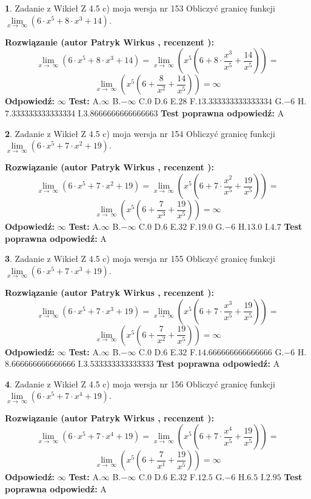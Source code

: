 \documentclass[12pt, a4paper]{article}
\theoremstyle{definition} %
\newtheorem{zad}{}
\newcommand{\zadStart}[1]{\begin{zad}#1\newline}
\newcommand{\zadStop}{\end{zad}}
\newcommand{\rozwStart}[2]{\noindent \textbf{Rozwiązanie (autor #1 , recenzent #2): }\newline}
\newcommand{\rozwStop}{\newline}
\newcommand{\odpStart}{\noindent \textbf{Odpowiedź:}\newline}
\newcommand{\odpStop}{\newline}
\newcommand{\testStart}{\noindent \textbf{Test:}\newline}
\newcommand{\testStop}{\newline}
\newcommand{\kluczStart}{\noindent \textbf{Test poprawna odpowiedź:}\newline}
\newcommand{\kluczStop}{\newline}
\begin{document}
\zadStart{Zadanie z Wikieł Z 4.5 c) moja wersja nr 153}
Obliczyć granicę funkcji  $\lim\limits_{x\to\ \infty}(6 \cdot x^{5}+8 \cdot x^{3}+14)$.
\zadStop
\rozwStart{Patryk Wirkus}{}
$$\lim\limits_{x\to\ \infty}(6 \cdot x^{5}+8 \cdot x^{3}+14) = \lim\limits_{x\to\ \infty}(x^{5}(6 +8 \cdot \frac{x^{3}}{x^{5}}+\frac{14}{x^{5}})) =$$ $$\lim\limits_{x\to\ \infty}(x^{5}(6 +\frac{8}{x^{2}}+\frac{14}{x^{5}})) =\infty$$
\rozwStop
\odpStart
$\infty$
\odpStop
\testStart
A.$\infty$ B.$-\infty$ C.$0$ D.$6$ E.$28$
F.$13.333333333333334$ G.$-6$
H.$7.333333333333334$
I.$3.8666666666666663$
\testStop
\kluczStart
A
\kluczStop



\zadStart{Zadanie z Wikieł Z 4.5 c) moja wersja nr 154}
Obliczyć granicę funkcji  $\lim\limits_{x\to\ \infty}(6 \cdot x^{5}+7 \cdot x^{2}+19)$.
\zadStop
\rozwStart{Patryk Wirkus}{}
$$\lim\limits_{x\to\ \infty}(6 \cdot x^{5}+7 \cdot x^{2}+19) = \lim\limits_{x\to\ \infty}(x^{5}(6 +7 \cdot \frac{x^{2}}{x^{5}}+\frac{19}{x^{5}})) =$$ $$\lim\limits_{x\to\ \infty}(x^{5}(6 +\frac{7}{x^{3}}+\frac{19}{x^{5}})) =\infty$$
\rozwStop
\odpStart
$\infty$
\odpStop
\testStart
A.$\infty$ B.$-\infty$ C.$0$ D.$6$ E.$32$
F.$19.0$ G.$-6$
H.$13.0$
I.$4.7$
\testStop
\kluczStart
A
\kluczStop



\zadStart{Zadanie z Wikieł Z 4.5 c) moja wersja nr 155}
Obliczyć granicę funkcji  $\lim\limits_{x\to\ \infty}(6 \cdot x^{5}+7 \cdot x^{3}+19)$.
\zadStop
\rozwStart{Patryk Wirkus}{}
$$\lim\limits_{x\to\ \infty}(6 \cdot x^{5}+7 \cdot x^{3}+19) = \lim\limits_{x\to\ \infty}(x^{5}(6 +7 \cdot \frac{x^{3}}{x^{5}}+\frac{19}{x^{5}})) =$$ $$\lim\limits_{x\to\ \infty}(x^{5}(6 +\frac{7}{x^{2}}+\frac{19}{x^{5}})) =\infty$$
\rozwStop
\odpStart
$\infty$
\odpStop
\testStart
A.$\infty$ B.$-\infty$ C.$0$ D.$6$ E.$32$
F.$14.666666666666666$ G.$-6$
H.$8.666666666666666$
I.$3.533333333333333$
\testStop
\kluczStart
A
\kluczStop



\zadStart{Zadanie z Wikieł Z 4.5 c) moja wersja nr 156}
Obliczyć granicę funkcji  $\lim\limits_{x\to\ \infty}(6 \cdot x^{5}+7 \cdot x^{4}+19)$.
\zadStop
\rozwStart{Patryk Wirkus}{}
$$\lim\limits_{x\to\ \infty}(6 \cdot x^{5}+7 \cdot x^{4}+19) = \lim\limits_{x\to\ \infty}(x^{5}(6 +7 \cdot \frac{x^{4}}{x^{5}}+\frac{19}{x^{5}})) =$$ $$\lim\limits_{x\to\ \infty}(x^{5}(6 +\frac{7}{x^{1}}+\frac{19}{x^{5}})) =\infty$$
\rozwStop
\odpStart
$\infty$
\odpStop
\testStart
A.$\infty$ B.$-\infty$ C.$0$ D.$6$ E.$32$
F.$12.5$ G.$-6$
H.$6.5$
I.$2.95$
\testStop
\kluczStart
A
\kluczStop
\end{document}
